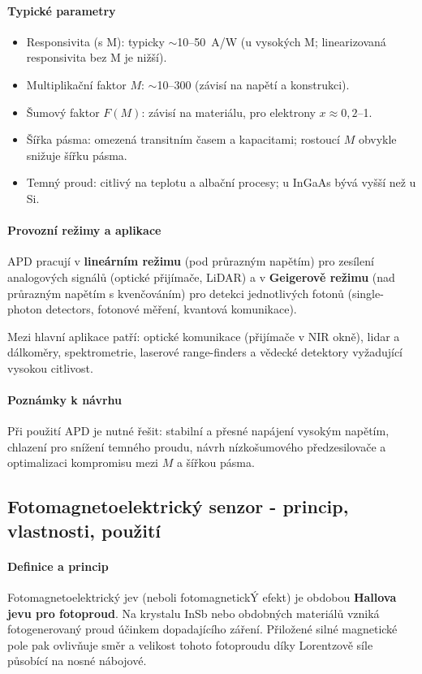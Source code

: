 \documentclass[a4paper, 12pt]{article}
\begin{document}
        \paragraph{Typické parametry}
        \begin{itemize}
            \item Responsivita (s M): typicky $\sim$10--50~A/W (u vysokých M; linearizovaná responsivita bez M je nižší).
            \item Multiplikační faktor $M$: $\sim$10--300 (závisí na napětí a konstrukci).
            \item Šumový faktor $F(M)$: závisí na materiálu, pro elektrony $x\approx0{,}2$--1.
            \item Šířka pásma: omezená transitním časem a kapacitami; rostoucí $M$ obvykle snižuje šířku pásma.
            \item Temný proud: citlivý na teplotu a albační procesy; u InGaAs bývá vyšší než u Si.
        \end{itemize}

        \paragraph{Provozní režimy a aplikace}
        APD pracují v \textbf{lineárním režimu} (pod průrazným napětím) pro zesílení analogových signálů
        (optické přijímače, LiDAR) a v \textbf{Geigerově režimu} (nad průrazným napětím s kvenčováním) pro
        detekci jednotlivých fotonů (single-photon detectors, fotonové měření, kvantová komunikace).

        Mezi hlavní aplikace patří: optické komunikace (přijímače v NIR okně), lidar a dálkoměry, spektrometrie,
        laserové range-finders a vědecké detektory vyžadující vysokou citlivost.

        \paragraph{Poznámky k návrhu}
        Při použití APD je nutné řešit: stabilní a přesné napájení vysokým napětím, chlazení pro snížení temného proudu,
        návrh nízkošumového předzesilovače a optimalizaci kompromisu mezi $M$ a šířkou pásma.

        \subsection{Fotomagnetoelektrický senzor - princip, vlastnosti, použití}
        \paragraph{Definice a princip}
        Fotomagnetoelektrický jev (neboli fotomagnetickÝ efekt) je obdobou \textbf{Hallova jevu pro fotoproud}.
        Na krystalu InSb nebo obdobných materiálů vzniká fotogenerovaný proud účinkem dopadajícího záření.
        Přiložené silné magnetické pole pak ovlivňuje směr a velikost tohoto fotoproudu díky Lorentzově síle
        působící na nosné nábojové.
\end{document}
